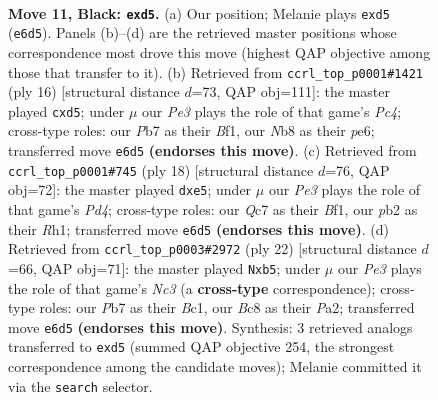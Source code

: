 \documentclass[11pt]{article}
\begin{document}
\clearpage

\begin{figure}[p]\centering
\begin{subfigure}{0.46\textwidth}\centering
\resizebox{\linewidth}{!}{%
\newchessgame
\chessboard[
  setfen={rnbr2k1/ppq1bppp/4pn2/2pP4/P1P4P/3P1NP1/1P1N1PB1/R1BQ1RK1 b - - 0 11},
  showmover=false,
  pgfstyle=straightmove, color=movearrow, markmove={e6-d5}
]}
\caption{}
\end{subfigure}\hfill
\begin{subfigure}{0.46\textwidth}\centering
\resizebox{\linewidth}{!}{%
\newchessgame
\chessboard[
  setfen={r1bq1rk1/pp1n1pbp/4pnp1/2pp4/2PP4/2N1PN2/PPQB1PPP/2R1KB1R w K - 0 9},
  showmover=false,
  pgfstyle=straightmove, color=movearrow, markmove={c4-d5}
]}
\caption{}
\end{subfigure}
\\[4pt]
\begin{subfigure}{0.46\textwidth}\centering
\resizebox{\linewidth}{!}{%
\newchessgame
\chessboard[
  setfen={r1bq1rk1/p2nppbp/2p2np1/1p2p3/3P4/P1N1BN1P/1PPQ1PP1/R3KB1R w KQ - 0 10},
  showmover=false,
  pgfstyle=straightmove, color=movearrow, markmove={d4-e5}
]}
\caption{}
\end{subfigure}\hfill
\begin{subfigure}{0.46\textwidth}\centering
\resizebox{\linewidth}{!}{%
\newchessgame
\chessboard[
  setfen={r1bqr1k1/3nbppp/3p1n2/pp2p3/3PP3/2N2NPP/PPQ2PB1/R1B2RK1 w - - 0 12},
  showmover=false,
  pgfstyle=straightmove, color=movearrow, markmove={c3-b5}
]}
\caption{}
\end{subfigure}
\caption{\textbf{Move 11, Black: \texttt{exd5}.} (a) Our position; Melanie plays \texttt{exd5} (\texttt{e6d5}). Panels (b)--(d) are the retrieved master positions whose correspondence most drove this move (highest QAP objective among those that transfer to it). (b) Retrieved from \texttt{ccrl\_top\_p0001\#1421} (ply 16) [structural distance $d$=73, QAP obj=111]: the master played \texttt{cxd5}; under $\mu$ our \emph{Pe3} plays the role of that game's \emph{Pc4}; cross-type roles: our \emph{P}b7 as their \emph{B}f1, our \emph{N}b8 as their \emph{p}e6; transferred move \texttt{e6d5} \textbf{(endorses this move)}. (c) Retrieved from \texttt{ccrl\_top\_p0001\#745} (ply 18) [structural distance $d$=76, QAP obj=72]: the master played \texttt{dxe5}; under $\mu$ our \emph{Pe3} plays the role of that game's \emph{Pd4}; cross-type roles: our \emph{Q}c7 as their \emph{B}f1, our \emph{p}b2 as their \emph{R}h1; transferred move \texttt{e6d5} \textbf{(endorses this move)}. (d) Retrieved from \texttt{ccrl\_top\_p0003\#2972} (ply 22) [structural distance $d$=66, QAP obj=71]: the master played \texttt{Nxb5}; under $\mu$ our \emph{Pe3} plays the role of that game's \emph{Nc3} (a \textbf{cross-type} correspondence); cross-type roles: our \emph{P}b7 as their \emph{B}c1, our \emph{B}c8 as their \emph{P}a2; transferred move \texttt{e6d5} \textbf{(endorses this move)}. Synthesis: 3 retrieved analogs transferred to \texttt{exd5} (summed QAP objective 254, the strongest correspondence among the candidate moves); Melanie committed it via the \texttt{search} selector.}
\label{fig:thought-m21}
\end{figure}
\end{document}
